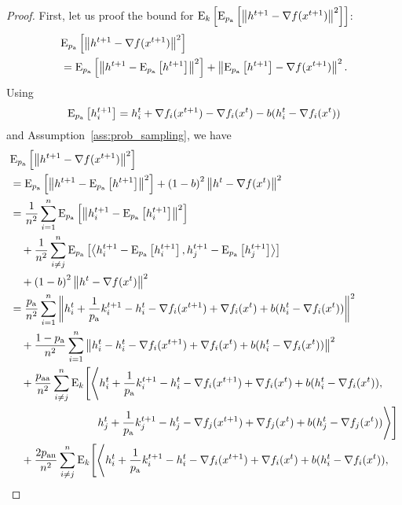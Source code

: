 \documentclass{article}
\newcommand*{\probavailable}{\ensuremath{p_{\textnormal{a}}}}
\newcommand*{\probpairaa}{\ensuremath{p_{\textnormal{aa}}}}
\newcommand*{\probpairan}{\ensuremath{p_{\textnormal{an}}}}
\begin{document}
\begin{proof}
  First, let us proof the bound for $\ExpSub{k}{\ExpSub{\probavailable}{\norm{h^{t+1} - \nabla f(x^{t+1})}^2}}$:
  \begin{align*}
      &\ExpSub{\probavailable}{\norm{h^{t+1} - \nabla f(x^{t+1})}^2} \\
      &=\ExpSub{\probavailable}{\norm{h^{t+1} - \ExpSub{\probavailable}{h^{t+1}}}^2} + \norm{\ExpSub{\probavailable}{h^{t+1}} - \nabla f(x^{t+1})}^2.
  \end{align*}
  Using
  \begin{align*}
      \ExpSub{\probavailable}{h^{t+1}_i} = h^{t}_i + \nabla f_i(x^{t+1}) - \nabla f_i(x^{t}) - b(h^t_i - \nabla f_i(x^{t}))
  \end{align*}
  and Assumption~\ref{ass:prob_sampling}, we have
  \begin{align*}
      &\ExpSub{\probavailable}{\norm{h^{t+1} - \nabla f(x^{t+1})}^2} \\
      &=\ExpSub{\probavailable}{\norm{h^{t+1} - \ExpSub{\probavailable}{h^{t+1}}}^2} + \left(1 - b\right)^2 \norm{h^{t} - \nabla f(x^{t})}^2\\
      &=\frac{1}{n^2}\sum_{i=1}^n \ExpSub{\probavailable}{\norm{h^{t+1}_i - \ExpSub{\probavailable}{h^{t+1}_i}}^2} \\
      &\quad+ \frac{1}{n^2}\sum_{i\neq j}^n \ExpSub{\probavailable}{\inp{h^{t+1}_i - \ExpSub{\probavailable}{h^{t+1}_i}}{h^{t+1}_j - \ExpSub{\probavailable}{h^{t+1}_j}}} \\
      &\quad + \left(1 - b\right)^2 \norm{h^{t} - \nabla f(x^{t})}^2 \\
      &=\frac{\probavailable}{n^2}\sum_{i=1}^n \norm{h^{t}_i + \frac{1}{\probavailable}k^{t+1}_i - h^{t}_i - \nabla f_i(x^{t+1}) + \nabla f_i(x^{t}) + b(h^t_i - \nabla f_i(x^{t}))}^2 \\
      &\quad + \frac{1 - \probavailable}{n^2}\sum_{i=1}^n \norm{h^{t}_i - h^{t}_i - \nabla f_i(x^{t+1}) + \nabla f_i(x^{t}) + b(h^t_i - \nabla f_i(x^{t}))}^2 \\
      &\quad +\frac{\probpairaa}{n^2}\sum_{i \neq j}^n{\rm E}_{k}\Bigg[\Bigg\langle h^{t}_i + \frac{1}{\probavailable}k^{t+1}_i - h^{t}_i - \nabla f_i(x^{t+1}) + \nabla f_i(x^{t}) + b(h^t_i - \nabla f_i(x^{t})), \\
      &\qquad\qquad\qquad\qquad h^{t}_j + \frac{1}{\probavailable}k^{t+1}_j - h^{t}_j - \nabla f_j(x^{t+1}) + \nabla f_j(x^{t}) + b(h^t_j - \nabla f_j(x^{t}))\Bigg\rangle\Bigg] \\
      &\quad +\frac{2\probpairan}{n^2}\sum_{i \neq j}^n{\rm E}_{k}\Bigg[\Bigg\langle h^{t}_i + \frac{1}{\probavailable}k^{t+1}_i - h^{t}_i - \nabla f_i(x^{t+1}) + \nabla f_i(x^{t}) + b(h^t_i - \nabla f_i(x^{t})),\\

\end{align*}
\end{proof}
\end{document}

